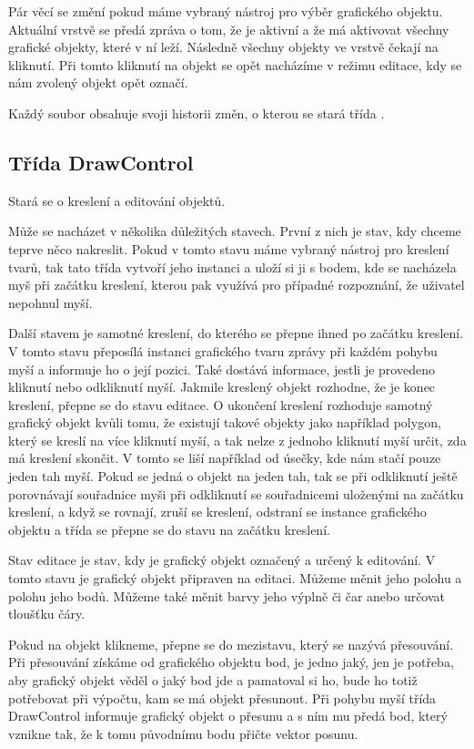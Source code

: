 \documentclass[
  field=inf,
  biblatex,
  glossaries,
  index
]{kidiplom}
\begin{document}
Pár věcí se změní pokud máme vybraný nástroj pro výběr grafického objektu. Aktuální vrstvě se předá zpráva o tom, že je aktivní a že má aktivovat všechny grafické objekty, které v ní leží. Následně všechny objekty ve vrstvě čekají na kliknutí. Při tomto kliknutí na objekt se opět nacházíme v režimu editace, kdy se nám zvolený objekt opět označí.

Každý soubor obsahuje svoji historii změn, o kterou se stará třída .

\subsection{Třída DrawControl}

Stará se o kreslení a editování objektů.

Může se nacházet v několika důležitých stavech. První z nich je stav, kdy chceme teprve něco nakreslit. Pokud v tomto stavu máme vybraný nástroj pro kreslení tvarů, tak tato třída vytvoří jeho instanci a uloží si ji s bodem, kde se nacházela myš při začátku kreslení, kterou pak využívá pro případné rozpoznání, že uživatel nepohnul myší. 

Další stavem je samotné kreslení, do kterého se přepne ihned po začátku kreslení. V tomto stavu přeposílá instanci grafického tvaru zprávy při každém pohybu myší a informuje ho o její pozici. Také dostává informace, jestli je provedeno kliknutí nebo odkliknutí myší. Jakmile kreslený objekt rozhodne, že je konec kreslení, přepne se  do stavu editace. O ukončení kreslení rozhoduje samotný grafický objekt kvůli tomu, že existují takové objekty jako například polygon, který se kreslí na více kliknutí myší, a tak nelze z jednoho kliknutí myší určit, zda má kreslení skončit. V tomto se liší například od úsečky, kde nám stačí pouze jeden tah myší. Pokud se jedná o objekt na jeden tah, tak se při odkliknutí ještě porovnávají souřadnice myši při odkliknutí se souřadnicemi uloženými na začátku kreslení, a když se rovnají, zruší se kreslení, odstraní se instance grafického objektu a třída  se přepne se do stavu na začátku kreslení.

Stav editace je stav, kdy je grafický objekt označený a určený k editování. V tomto stavu je grafický objekt připraven na editaci. Můžeme měnit jeho polohu a polohu jeho bodů. Můžeme také měnit barvy jeho výplně či čar anebo určovat tloušťku čáry.

Pokud na objekt klikneme, přepne se do mezistavu, který se nazývá přesouvání. Při přesouvání získáme od grafického objektu bod, je jedno jaký, jen je potřeba, aby grafický objekt věděl o jaký bod jde a pamatoval si ho, bude ho totiž potřebovat při výpočtu, kam se má objekt přesunout. Při pohybu myší třída DrawControl informuje grafický objekt o přesunu a s ním mu předá bod, který vznikne tak, že k tomu původnímu bodu přičte vektor posunu.
\end{document}
